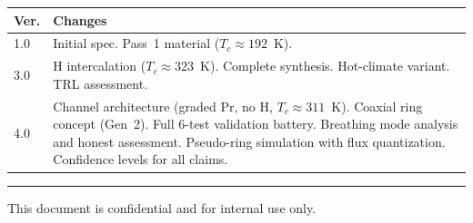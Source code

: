 \documentclass[11pt, a4paper]{article}
\begin{document}
\begin{center}
\begin{tabular}{@{}lp{9cm}@{}}
\toprule
\textbf{Ver.} & \textbf{Changes} \\
\midrule
1.0 & Initial spec. Pass~1 material ($T_c \approx 192$~K). \\
3.0 & H intercalation ($T_c \approx 323$~K). Complete synthesis.
      Hot-climate variant. TRL assessment. \\
4.0 & Channel architecture (graded Pr, no H, $T_c \approx 311$~K).
      Coaxial ring concept (Gen~2). Full 6-test validation battery.
      Breathing mode analysis and honest assessment. Pseudo-ring
      simulation with flux quantization. Confidence levels for all
      claims. \\
\bottomrule
\end{tabular}
\end{center}

\vspace{2em}\hrule\vspace{0.5em}
{\color{nm-gray}\small This document is confidential and for internal use only.}
\end{document}
